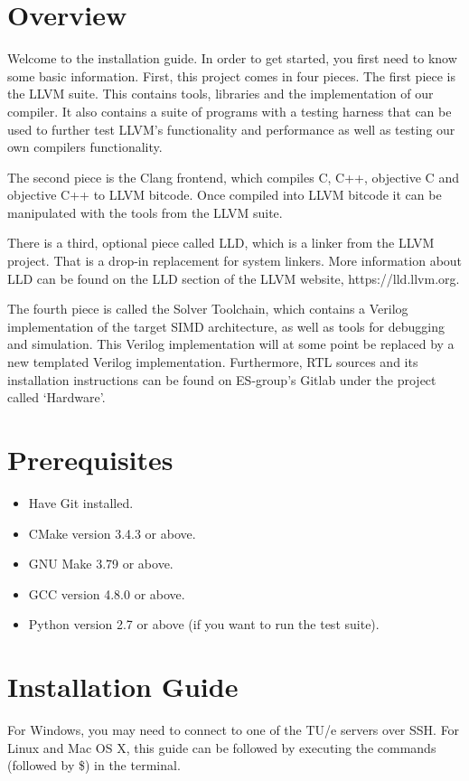 \section{Overview}
Welcome to the installation guide. In order to get started, you first need to know some basic information. First, this project comes in four pieces. The first piece is the LLVM suite. This contains tools, libraries and the implementation of our compiler. It also contains a suite of programs with a testing harness that can be used to further test LLVM's functionality and performance as well as testing our own compilers functionality.

The second piece is the Clang frontend, which compiles C, C++, objective C and objective C++ to LLVM bitcode. Once compiled into LLVM bitcode it can be manipulated with the tools from the LLVM suite.

There is a third, optional piece called LLD, which is a linker from the LLVM project. That is a drop-in replacement for system linkers. More information about LLD can be found on the LLD section of the LLVM website, https://lld.llvm.org.

The fourth piece is called the Solver Toolchain, which contains a Verilog implementation of the target SIMD architecture, as well as tools for debugging and simulation. This Verilog implementation will at some point be replaced by a new templated Verilog implementation. Furthermore, RTL sources and its installation instructions can be found on ES-group's Gitlab under the project called `Hardware'.

\section{Prerequisites}
\begin{itemize}
	\item Have Git installed.
	\item CMake version 3.4.3 or above.
	\item GNU Make 3.79 or above.
	\item GCC version 4.8.0 or above.
	\item Python version 2.7 or above (if you want to run the test suite).
\end{itemize}

\section{Installation Guide}
For Windows, you may need to connect to one of the TU/e servers over SSH. For Linux and Mac OS X, this guide can be followed by executing the commands (followed by \$) in the terminal. 

